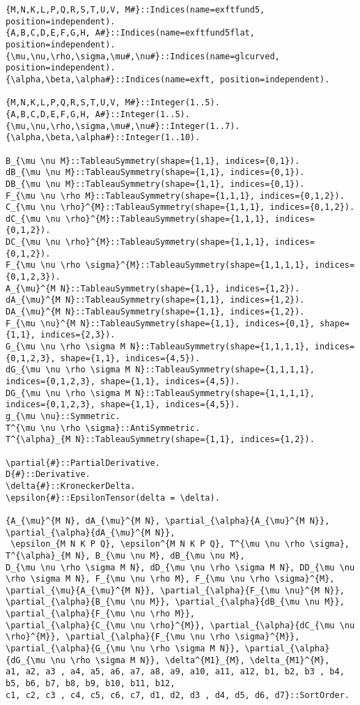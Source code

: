 \documentclass[11pt]{article}
\begin{document}
{\color[named]{Blue}\begin{verbatim}
{M,N,K,L,P,Q,R,S,T,U,V, M#}::Indices(name=exftfund5, position=independent).
{A,B,C,D,E,F,G,H, A#}::Indices(name=exftfund5flat, position=independent).
{\mu,\nu,\rho,\sigma,\mu#,\nu#}::Indices(name=glcurved, position=independent).
{\alpha,\beta,\alpha#}::Indices(name=exft, position=independent).

{M,N,K,L,P,Q,R,S,T,U,V, M#}::Integer(1..5).
{A,B,C,D,E,F,G,H, A#}::Integer(1..5).
{\mu,\nu,\rho,\sigma,\mu#,\nu#}::Integer(1..7).
{\alpha,\beta,\alpha#}::Integer(1..10).

B_{\mu \nu M}::TableauSymmetry(shape={1,1}, indices={0,1}).
dB_{\mu \nu M}::TableauSymmetry(shape={1,1}, indices={0,1}).
DB_{\mu \nu M}::TableauSymmetry(shape={1,1}, indices={0,1}).
F_{\mu \nu \rho M}::TableauSymmetry(shape={1,1,1}, indices={0,1,2}).
C_{\mu \nu \rho}^{M}::TableauSymmetry(shape={1,1,1}, indices={0,1,2}).
dC_{\mu \nu \rho}^{M}::TableauSymmetry(shape={1,1,1}, indices={0,1,2}).
DC_{\mu \nu \rho}^{M}::TableauSymmetry(shape={1,1,1}, indices={0,1,2}).
F_{\mu \nu \rho \sigma}^{M}::TableauSymmetry(shape={1,1,1,1}, indices={0,1,2,3}).
A_{\mu}^{M N}::TableauSymmetry(shape={1,1}, indices={1,2}).
dA_{\mu}^{M N}::TableauSymmetry(shape={1,1}, indices={1,2}).
DA_{\mu}^{M N}::TableauSymmetry(shape={1,1}, indices={1,2}).
F_{\mu \nu}^{M N}::TableauSymmetry(shape={1,1}, indices={0,1}, shape={1,1}, indices={2,3}).
G_{\mu \nu \rho \sigma M N}::TableauSymmetry(shape={1,1,1,1}, indices={0,1,2,3}, shape={1,1}, indices={4,5}).
dG_{\mu \nu \rho \sigma M N}::TableauSymmetry(shape={1,1,1,1}, indices={0,1,2,3}, shape={1,1}, indices={4,5}).
DG_{\mu \nu \rho \sigma M N}::TableauSymmetry(shape={1,1,1,1}, indices={0,1,2,3}, shape={1,1}, indices={4,5}).
g_{\mu \nu}::Symmetric.
T^{\mu \nu \rho \sigma}::AntiSymmetric.
T^{\alpha}_{M N}::TableauSymmetry(shape={1,1}, indices={1,2}).

\partial{#}::PartialDerivative.
D{#}::Derivative.
\delta{#}::KroneckerDelta.
\epsilon{#}::EpsilonTensor(delta = \delta).

{A_{\mu}^{M N}, dA_{\mu}^{M N}, \partial_{\alpha}{A_{\mu}^{M N}}, \partial_{\alpha}{dA_{\mu}^{M N}},
 \epsilon_{M N K P Q}, \epsilon^{M N K P Q}, T^{\mu \nu \rho \sigma}, T^{\alpha}_{M N}, B_{\mu \nu M}, dB_{\mu \nu M}, 
D_{\mu \nu \rho \sigma M N}, dD_{\mu \nu \rho \sigma M N}, DD_{\mu \nu \rho \sigma M N}, F_{\mu \nu \rho M}, F_{\mu \nu \rho \sigma}^{M},
\partial_{\mu}{A_{\mu}^{M N}}, \partial_{\alpha}{F_{\mu \nu}^{M N}},
\partial_{\alpha}{B_{\mu \nu M}}, \partial_{\alpha}{dB_{\mu \nu M}}, \partial_{\alpha}{F_{\mu \nu \rho M}}, 
\partial_{\alpha}{C_{\mu \nu \rho}^{M}}, \partial_{\alpha}{dC_{\mu \nu \rho}^{M}}, \partial_{\alpha}{F_{\mu \nu \rho \sigma}^{M}},
\partial_{\alpha}{G_{\mu \nu \rho \sigma M N}}, \partial_{\alpha}{dG_{\mu \nu \rho \sigma M N}}, \delta^{M1}_{M}, \delta_{M1}^{M},
a1, a2, a3 , a4, a5, a6, a7, a8, a9, a10, a11, a12, b1, b2, b3 , b4, b5, b6, b7, b8, b9, b10, b11, b12,
c1, c2, c3 , c4, c5, c6, c7, d1, d2, d3 , d4, d5, d6, d7}::SortOrder.


\end{verbatim}}
\end{document}
